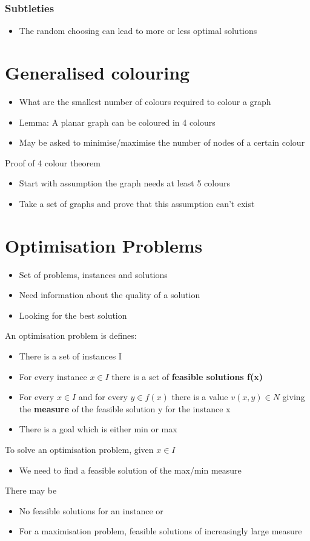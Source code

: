 \documentclass{article}[18pt]
\begin{document}
\subsubsection{Subtleties}
\begin{itemize}
\item The random choosing can lead to more or less optimal solutions
\end{itemize}


\section{Generalised colouring}
\begin{itemize}
\item What are the smallest number of colours required to colour a graph
\item Lemma: A planar graph can be coloured in 4 colours
\item May be asked to minimise/maximise the number of nodes of a certain colour
\end{itemize}
Proof of 4 colour theorem
\begin{itemize}
\item Start with assumption the graph needs at least 5 colours
\item Take a set of graphs and prove that this assumption can't exist
\end{itemize}
\section{Optimisation Problems}
\begin{itemize}
\item Set of problems, instances and solutions
\item Need information about the quality of a solution
\item Looking for the best solution
\end{itemize}
An optimisation problem is defines:
\begin{itemize}
\item There is a set of instances I
\item For every instance $x\in I$ there is a set of \textbf{feasible solutions f(x)}
\item For every $x\in I$ and for every $y\in f(x)$ there is a value $v(x,y)\in N$ giving the \textbf{measure} of the feasible solution y for the instance x
\item There is a goal which is either min or max
\end{itemize}
To solve an optimisation problem, given $x\in I$
\begin{itemize}
\item We need to find a feasible solution of the max/min measure
\end{itemize}
There may be
\begin{itemize}
\item No feasible solutions for an instance or
\item For a maximisation problem, feasible solutions of increasingly large measure
\end{itemize}
\end{document}
